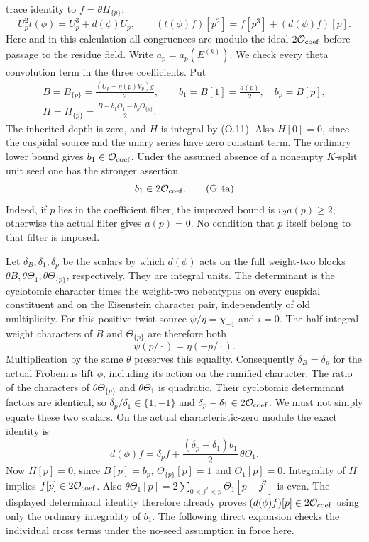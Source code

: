 trace identity to $f=\theta H_{\{p\}}$:
\[
 U_p^2t(\phi)=U_p^3+d(\phi)U_p,\qquad
 (t(\phi)f)[p^2]=f[p^3]+(d(\phi)f)[p].
\]
Here and in this calculation all congruences are modulo the ideal
$2\mathcal O_{\rm coef}$ before passage to the residue field.
Write $a_p=a_p(E^{(k)})$.
We check every theta convolution term in the three coefficients.
Put
\[
\begin{gathered}
 B=B_{\{p\}}=\frac{(U_p-\eta(p)V_p)g}{2},\qquad
 b_1=B[1]=\frac{a(p)}2,\quad b_p=B[p],\\
 H=H_{\{p\}}=\frac{B-b_1\Theta_1-b_p\Theta_{\{p\}}}{2}.
\end{gathered}
\]
The inherited depth is zero, and $H$ is integral by (O.11).
Also $H[0]=0$, since the cuspidal source and the unary series have
zero constant term.
The ordinary lower bound gives $b_1\in\mathcal O_{\rm coef}$.
Under the assumed absence of a nonempty $K$-split unit seed one
has the stronger assertion
\[
                         b_1\in2\mathcal O_{\rm coef}.          \tag{G.4a}
\]
Indeed, if $p$ lies in the coefficient filter, the improved bound is
$v_2a(p)\ge2$; otherwise the actual filter gives $a(p)=0$.
No condition that $p$ itself belong to that filter is imposed.

Let $\delta_B,\delta_1,\delta_p$ be the scalars by which $d(\phi)$
acts on the full weight-two blocks
$\theta B,\theta\Theta_1,\theta\Theta_{\{p\}}$, respectively.
They are integral units.  The determinant is the cyclotomic character
times the weight-two nebentypus on every cuspidal constituent and
on the Eisenstein character pair, independently of old multiplicity.
For this positive-twist source $\psi/\eta=\chi_{-1}$ and $i=0$.
The half-integral-weight characters of $B$ and $\Theta_{\{p\}}$
are therefore both
\[
                 \psi(p/\cdot)=\eta(-p/\cdot).
\]
Multiplication by the same $\theta$ preserves this equality.
Consequently $\delta_B=\delta_p$ for the actual Frobenius lift
$\phi$, including its action on the ramified character.  The ratio
of the characters of $\theta\Theta_{\{p\}}$ and
$\theta\Theta_1$ is quadratic.  Their cyclotomic determinant factors
are identical, so $\delta_p/\delta_1\in\{1,-1\}$ and
$\delta_p-\delta_1\in2\mathcal O_{\rm coef}$.  We must not simply
equate these two scalars.  On the actual characteristic-zero
module the exact identity is
\[
 d(\phi)f=\delta_p f+
       \frac{(\delta_p-\delta_1)b_1}{2}\,\theta\Theta_1.
\]
Now $H[p]=0$, since $B[p]=b_p$, $\Theta_{\{p\}}[p]=1$ and
$\Theta_1[p]=0$.  Integrality of $H$ implies $f[p]\in2\mathcal O_{\rm coef}$.
Also $\theta\Theta_1[p]=2\sum_{0<j^2<p}\Theta_1[p-j^2]$ is even.
The displayed determinant identity therefore already proves
$(d(\phi)f)[p]\in2\mathcal O_{\rm coef}$ using only the ordinary
integrality of $b_1$.  The following direct expansion checks the
individual cross terms under the no-seed assumption in force here.

